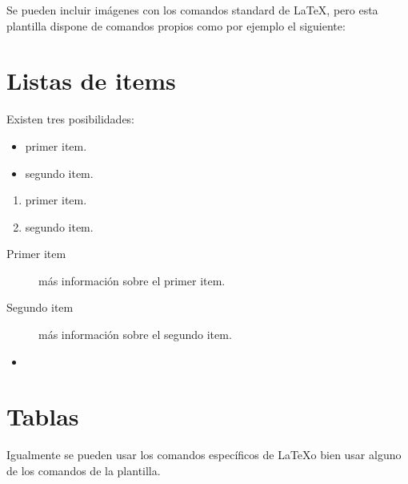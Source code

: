 Se pueden incluir imágenes con los comandos standard de \LaTeX, pero esta plantilla dispone de comandos propios como por ejemplo el siguiente:




\section{Listas de items}

Existen tres posibilidades:

\begin{itemize}
	\item primer item.
	\item segundo item.
\end{itemize}

\begin{enumerate}
	\item primer item.
	\item segundo item.
\end{enumerate}

\begin{description}
	\item[Primer item] más información sobre el primer item.
	\item[Segundo item] más información sobre el segundo item.
\end{description}
	
\begin{itemize}
\item 
\end{itemize}

\section{Tablas}

Igualmente se pueden usar los comandos específicos de \LaTeX o bien usar alguno de los comandos de la plantilla.

